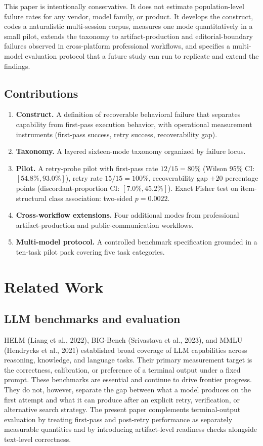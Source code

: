 \documentclass[11pt]{article}
\begin{document}
This paper is intentionally conservative. It does not estimate population-level failure rates for any vendor, model family, or product. It develops the construct, codes a naturalistic multi-session corpus, measures one mode quantitatively in a small pilot, extends the taxonomy to artifact-production and editorial-boundary failures observed in cross-platform professional workflows, and specifies a multi-model evaluation protocol that a future study can run to replicate and extend the findings.

\subsection{Contributions}
\begin{enumerate}[leftmargin=*, label=\arabic*.]
  \item \textbf{Construct.} A definition of recoverable behavioral failure that separates capability from first-pass execution behavior, with operational measurement instruments (first-pass success, retry success, recoverability gap).
  \item \textbf{Taxonomy.} A layered sixteen-mode taxonomy organized by failure locus.
  \item \textbf{Pilot.} A retry-probe pilot with first-pass rate $12/15 = 80\%$ (Wilson 95\% CI: $[54.8\%, 93.0\%]$), retry rate $15/15 = 100\%$, recoverability gap $+20$ percentage points (discordant-proportion CI: $[7.0\%, 45.2\%]$). Exact Fisher test on item-structural class association: two-sided $p = 0.0022$.
  \item \textbf{Cross-workflow extensions.} Four additional modes from professional artifact-production and public-communication workflows.
  \item \textbf{Multi-model protocol.} A controlled benchmark specification grounded in a ten-task pilot pack covering five task categories.
\end{enumerate}

\section{Related Work}

\subsection{LLM benchmarks and evaluation}
HELM (Liang et al., 2022), BIG-Bench (Srivastava et al., 2023), and MMLU (Hendrycks et al., 2021) established broad coverage of LLM capabilities across reasoning, knowledge, and language tasks. Their primary measurement target is the correctness, calibration, or preference of a terminal output under a fixed prompt. These benchmarks are essential and continue to drive frontier progress. They do not, however, separate the gap between what a model produces on the first attempt and what it can produce after an explicit retry, verification, or alternative search strategy. The present paper complements terminal-output evaluation by treating first-pass and post-retry performance as separately measurable quantities and by introducing artifact-level readiness checks alongside text-level correctness.
\end{document}
